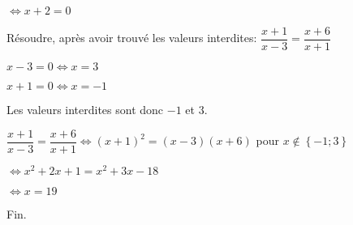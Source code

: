 \documentclass[a4paper,12pt]{scrartcl}
\begin{document}
$\Leftrightarrow x+2 = 0$


\question{} Résoudre, après avoir trouvé les valeurs interdites: $\dfrac{x+1}{x-3} = \dfrac{x+6}{x+1}$


$x-3 = 0 \Leftrightarrow x = 3$

$x+1 = 0 \Leftrightarrow x = -1$

Les valeurs interdites sont donc $-1$ et $3$.


$\dfrac{x+1}{x-3} = \dfrac{x+6}{x+1} \Leftrightarrow (x+1)^{2} = (x-3)(x+6)$ pour $x \notin \left\lbrace -1 ; 3 \right\rbrace$

$\Leftrightarrow x^{2} + 2x + 1 = x^{2} + 3x - 18$

$\Leftrightarrow x = 19$


\trait

\begin{center}
Fin.
\end{center}
\end{document}
